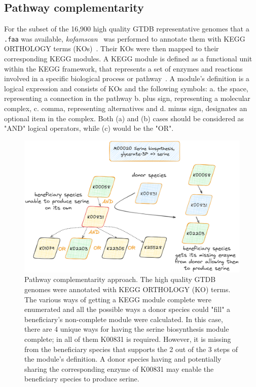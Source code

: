\documentclass[sn-mathphys,Numbered]{sn-jnl}%
\theoremstyle{thmstyleone}%
\theoremstyle{thmstyletwo}%
\theoremstyle{thmstylethree}%
\begin{document}
    \subsection*{ Pathway complementarity }
        \label{subsec:path-compl}

        For the subset of the 16,900 high quality GTDB representative genomes that a \texttt{.faa} was available, 
        \textit{kofamscan}~\cite{aramaki2020kofamkoala} was performed to annotate them with KEGG ORTHOLOGY terms (KOs)~\cite{kanehisa2012kegg}. 
        Their KOs were then mapped to their corresponding KEGG modules. 
        A KEGG module is defined as a functional unit within the KEGG framework, that represents a set of enzymes and reactions involved in a specific biological process or pathway~\cite{muto2013modular}.
        A module's definition is a logical expression and consists of KOs and the following symbols:
        a. the space, representing a connection in the pathway
        b. plus sign, representing a molecular complex,  
        c. comma, representing alternatives and
        d. minus sign, designates an optional item in the complex.
        Both (a) and (b) cases should be considered as "AND" logical operators, while (c) would be the "OR".



        \begin{figure}[h!]
            \label{fig:path-compl}
            \includegraphics*[width=0.8\columnwidth]{figs/path_complem.png}
            \caption{
                Pathway complementarity approach. 
                The high quality GTDB genomes were annotated with KEGG ORTHOLOGY (KO) terms.
                The various ways of getting a KEGG module complete were enumerated and all the possible ways a donor species
                could "fill" a beneficiary's non-complete module were calculated. 
                In this case, there are 4 unique ways for having the serine biosynthesis module complete; in all of them K00831 is required. 
                However, it is missing from the beneficiary species that supports the 2 out of the 3 steps of the module's definition.
                A donor species having and potentially sharing the corresponding enzyme of K00831 may enable the beneficiary species to 
                produce serine.
            }
        \end{figure}
\end{document}
